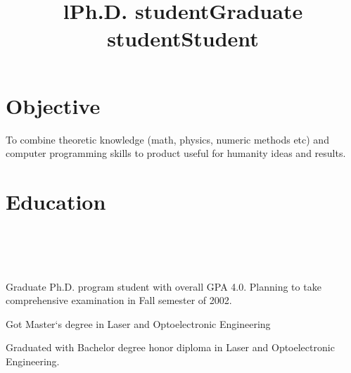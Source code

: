 \documentclass[10pt, overlapped, line]{res}
\begin{document}
\address{ 
  Preferred Mailing Address: 
  Computer Science Dept., FEC 
  UNM, Albuquerque NM, 87131 \\  
  USA
}  
\address{
   Current Address: 
   1335 Ortiz SE.  Apt.13 \\
   Albuquerque NM, 87108 \\
   USA
}
\address{  
  \texttt{yoh@cs.unm.edu}\\ 
  \href{URL}{http://www.cs.unm.edu/~yoh}\\
  \texttt{(505) 266-5958 (home)}
} 
 
\begin{resume}

\section{Objective} 

   To combine theoretic knowledge (math, physics, numeric methods etc)
   and computer programming skills to product useful for humanity
   ideas and results.

\section{Education}
\begin{format}
  \title{l}\\
  \\
  \body\\
\end{format}

\title{Ph.D. student}
\begin{position}
  Graduate Ph.D. program student with overall GPA 4.0. Planning to
take comprehensive examination in Fall semester of 2002.
\end{position}

\title{Graduate student}
\begin{position}
 Got Master`s degree in Laser and Optoelectronic Engineering
\end{position}

\title{Student}
\begin{position}
 Graduated with Bachelor degree honor diploma in Laser and Optoelectronic Engineering.
\end{position}


\end{resume}
\end{document}
